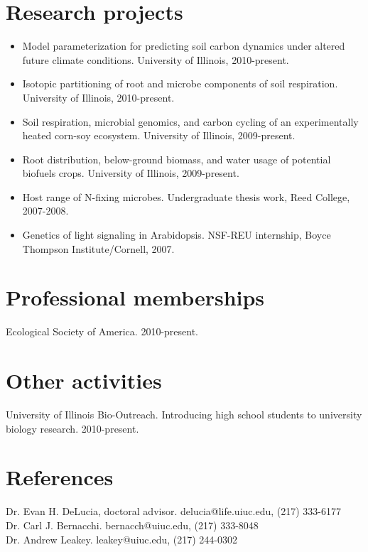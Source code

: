 \documentclass[centered,margin, 11pt]{resume}
\begin{document}
\section{Research projects}
\begin{itemize}
	\item{Model parameterization for predicting soil carbon dynamics under altered future climate conditions. University of Illinois, 2010-present.}
	\item{Isotopic partitioning of root and microbe components of soil respiration. University of Illinois, 2010-present.}
	\item{Soil respiration, microbial genomics, and carbon cycling of an experimentally heated corn-soy ecosystem. University of Illinois, 2009-present.}
	\item{Root distribution, below-ground biomass, and water usage of potential biofuels crops. University of Illinois, 2009-present.}
	\item{Host range of N-fixing microbes. Undergraduate thesis work, Reed College, 2007-2008.}
	\item{Genetics of light signaling in Arabidopsis. NSF-REU internship, Boyce Thompson Institute/Cornell, 2007.}
\end{itemize}


	
\section{Professional memberships}
	Ecological Society of America. 2010-present. 	
\section{Other activities}
	University of Illinois Bio-Outreach. Introducing high school students to university biology research. 2010-present.
	
\section{References}
	
	Dr. Evan H. DeLucia, doctoral advisor. delucia@life.uiuc.edu, (217) 333-6177\\
	Dr. Carl J. Bernacchi. bernacch@uiuc.edu, (217) 333-8048\\
	Dr. Andrew Leakey. leakey@uiuc.edu, (217) 244-0302
\end{document}
